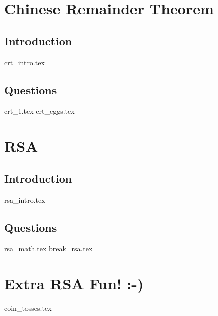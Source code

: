 \documentclass{exam}
\begin{document}
\section{Chinese Remainder Theorem}
\subsection{Introduction}
{crt_intro.tex}
\subsection{Questions}
\begin{questions}
{crt_1.tex}
{crt_eggs.tex}
\end{questions}

\section{RSA}
\subsection{Introduction}
{rsa_intro.tex}
\subsection{Questions}
\begin{questions}
{rsa_math.tex}
{break_rsa.tex}
\end{questions}

\section{Extra RSA Fun! :-)}
\begin{questions}
{coin_tosses.tex}
\end{questions}
\end{document}
